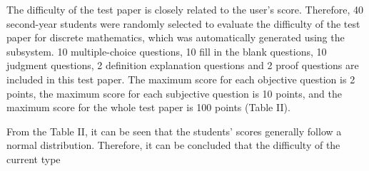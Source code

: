 \documentclass{article}
\begin{document}
\begin{multicols}{2}
The difficulty of the test paper is closely related to the user’s score. Therefore, 40 second-year students were randomly selected to evaluate the difficulty of the test paper for discrete mathematics, which was automatically generated using the subsystem. 10 multiple-choice questions, 10 fill in the blank questions, 10 judgment questions, 2 definition explanation questions and 2 proof questions are included in this test paper. The maximum score for each objective question is 2 points, the maximum score for each subjective question is 10 points, and the maximum score for the whole test paper is 100 points (Table II).

From the Table II, it can be seen that the students’ scores generally follow a normal distribution. Therefore, it can be concluded that the difficulty of the current type


\end{multicols} 
\end{document}

